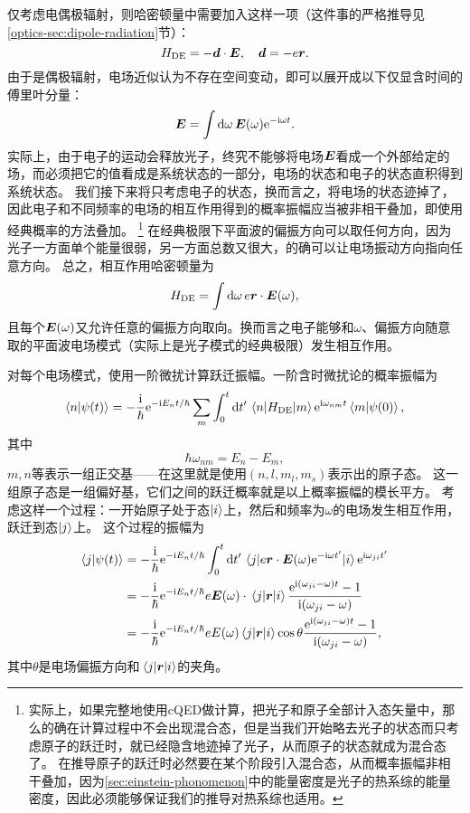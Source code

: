 仅考虑电偶极辐射，则哈密顿量中需要加入这样一项（这件事的严格推导见\ref{optics-sec:dipole-radiation}节）：
\begin{equation}
    {H}_\text{DE} = - {\vb*{d}} \cdot \vb*{E}, \quad {\vb*{d}} = -e {\vb*{r}}.
\end{equation}
由于是偶极辐射，电场近似认为不存在空间变动，即可以展开成以下仅显含时间的傅里叶分量：
\[
    \vb*{E} = \int \dd{\omega} \vb*{E}(\omega) \mathrm{e}^{- \mathrm{i} \omega t}.
\]
实际上，由于电子的运动会释放光子，终究不能够将电场$\vb*{E}$看成一个外部给定的场，而必须把它的值看成是系统状态的一部分，电场的状态和电子的状态直积得到系统状态。
我们接下来将只考虑电子的状态，换而言之，将电场的状态迹掉了，因此电子和不同频率的电场的相互作用得到的概率振幅应当被非相干叠加，即使用经典概率的方法叠加。%
\footnote{实际上，如果完整地使用cQED做计算，把光子和原子全部计入态矢量中，那么的确在计算过程中不会出现混合态，但是当我们开始略去光子的状态而只考虑原子的跃迁时，就已经隐含地迹掉了光子，从而原子的状态就成为混合态了。
在推导原子的跃迁时必然要在某个阶段引入混合态，从而概率振幅非相干叠加，因为\autoref{sec:einstein-phonomenon}中的能量密度是光子的热系综的能量密度，因此必须能够保证我们的推导对热系综也适用。}%
在经典极限下平面波的偏振方向可以取任何方向，因为光子一方面单个能量很弱，另一方面总数又很大，的确可以让电场振动方向指向任意方向。
总之，相互作用哈密顿量为
\[
    {H}_\text{DE} = \int \dd{\omega} e {\vb*{r}} \cdot \vb*{E}(\omega),
\]
且每个$\vb*{E}(\omega)$又允许任意的偏振方向取向。换而言之电子能够和$\omega$、偏振方向随意取的平面波电场模式（实际上是光子模式的经典极限）发生相互作用。

对每个电场模式，使用一阶微扰计算跃迁振幅。一阶含时微扰论的概率振幅为
\[
    \braket{n}{\psi(t)} = - \frac{\mathrm{i}}{\hbar} \mathrm{e}^{- \mathrm{i} E_n t / \hbar} \sum_m \int_0^t \dd{t'} \mel{n}{{H}_\text{DE}}{m} \mathrm{e}^{\mathrm{i} \omega_{nm} t} \braket{m}{\psi(0)},
\]
其中
\[
    \hbar \omega_{nm} = E_n - E_m,
\]
$m, n$等表示一组正交基——在这里就是使用$(n, l, m_l, m_s)$表示出的原子态。
这一组原子态是一组偏好基，它们之间的跃迁概率就是以上概率振幅的模长平方。
考虑这样一个过程：一开始原子处于态$\ket{i}$上，然后和频率为$\omega$的电场发生相互作用，跃迁到态$\ket{j}$上。
这个过程的振幅为
\[
    \begin{aligned}
        \braket{j}{\psi(t)} &= - \frac{\mathrm{i}}{\hbar} \mathrm{e}^{- \mathrm{i} E_n t / \hbar} \int_0^t \dd{t'} \mel{j}{e {\vb*{r}} \cdot \vb*{E}(\omega) \mathrm{e}^{- \mathrm{i}\omega t'}}{i} \mathrm{e}^{\mathrm{i} \omega_{ji} t'} \\
        &= - \frac{\mathrm{i}}{\hbar} \mathrm{e}^{- \mathrm{i} E_n t / \hbar} e \vb*{E}(\omega) \cdot \mel{j}{{\vb*{r}}}{i} \frac{\mathrm{e}^{\mathrm{i} (\omega_{ji} - \omega) t} - 1}{\mathrm{i} (\omega_{ji} - \omega)} \\
        &= - \frac{\mathrm{i}}{\hbar} \mathrm{e}^{- \mathrm{i} E_n t / \hbar} e E(\omega) \mel{j}{{\vb*{r}}}{i} \cos \theta \frac{\mathrm{e}^{\mathrm{i} (\omega_{ji} - \omega) t} - 1}{\mathrm{i} (\omega_{ji} - \omega)},
    \end{aligned}
\]
其中$\theta$是电场偏振方向和$\mel{j}{{\vb*{r}}}{i}$的夹角。

